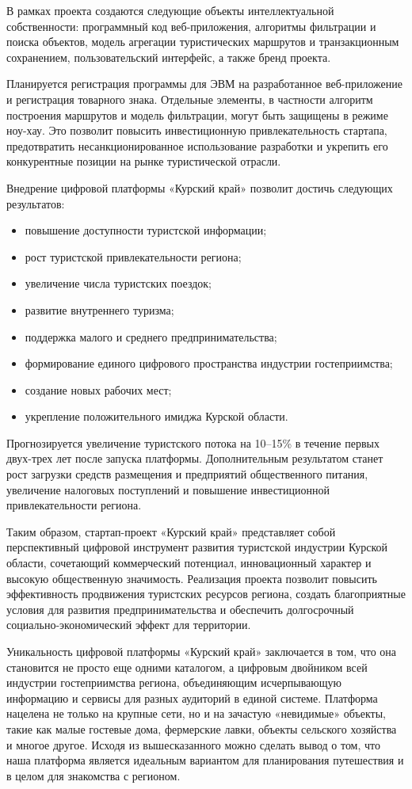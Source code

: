 В рамках проекта создаются следующие объекты интеллектуальной собственности: программный код веб-приложения, алгоритмы фильтрации и поиска объектов, модель агрегации туристических маршрутов и транзакционным сохранением, пользовательский интерфейс, а также бренд проекта.

Планируется регистрация программы для ЭВМ на разработанное веб-приложение и регистрация товарного знака. Отдельные элементы, в частности алгоритм построения маршрутов и модель фильтрации, могут быть защищены в режиме ноу-хау. Это позволит повысить инвестиционную привлекательность стартапа, предотвратить несанкционированное использование разработки и укрепить его конкурентные позиции на рынке туристической отрасли. 

Внедрение цифровой платформы «Курский край» позволит достичь следующих результатов:
\begin{itemize}
\item повышение доступности туристской информации;
\item рост туристской привлекательности региона;
\item увеличение числа туристских поездок;
\item развитие внутреннего туризма;
\item поддержка малого и среднего предпринимательства;
\item формирование единого цифрового пространства индустрии гостеприимства;
\item создание новых рабочих мест;
\item укрепление положительного имиджа Курской области.
\end{itemize}

Прогнозируется увеличение туристского потока на 10–15\% в течение первых двух-трех лет после запуска платформы. Дополнительным результатом станет рост загрузки средств размещения и предприятий общественного питания, увеличение налоговых поступлений и повышение инвестиционной привлекательности региона.

Таким образом, стартап-проект «Курский край» представляет собой перспективный цифровой инструмент развития туристской индустрии Курской области, сочетающий коммерческий потенциал, инновационный характер и высокую общественную значимость. Реализация проекта позволит повысить эффективность продвижения туристских ресурсов региона, создать благоприятные условия для развития предпринимательства и обеспечить долгосрочный социально-экономический эффект для территории.

Уникальность цифровой платформы «Курский край» заключается в том, что она становится не просто еще одними каталогом, а цифровым двойником всей индустрии гостеприимства региона, объединяющим исчерпывающую информацию и сервисы для разных аудиторий в единой системе. Платформа нацелена не только на крупные сети, но и на зачастую «невидимые» объекты, такие как малые гостевые дома, фермерские лавки, объекты сельского хозяйства и многое другое.
Исходя из вышесказанного можно сделать вывод о том, что наша платформа является идеальным вариантом для планирования путешествия и в целом для знакомства с регионом.
